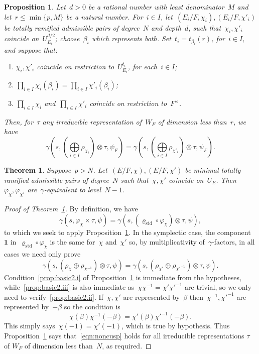 \documentclass[10pt,a4paper]{amsart}
\newtheorem{prop}{Proposition}
\newtheorem{thm}{Theorem}
\def\boI{\boldsymbol 1}
\def\rhostd{\varrho_{\mathrm{std}}} %
\begin{document}
\begin{prop}\label{prop:basic2}
Let~$d>0$ be a rational number with least denominator~$M$ and let~$r\le \min\{p,M\}$ be a natural number. 
For~$i\in I$, let~$(E_i/F,\chi_i),(E_i/F,\chi'_i)$ be totally ramified admissible pairs of degree~$N$ and depth~$d$, such that~$\chi_i,\chi'_i$ coincide on~$U^{d/2}_{E_i}$; choose~$\beta_i$ which represents both. Set~$t_i=t_{\beta_i}(r)$, for~$i\in I$, and suppose that:
\begin{enumerate}
\item\label{prop:basic2.i} $\chi_i,\chi'_i$ coincide on restriction to~$U_{E_i}^{t_i}$, for each~$i\in I$;\\[-8pt]
\item\label{prop:basic2.ii} $\prod_{i\in I} \chi_i(\beta_i) = \prod_{i\in I} \chi'_i(\beta_i)$;\\[-8pt]
\item\label{prop:basic2.iii} $ \prod_{i\in I} \chi_i$ and~$\prod_{i\in I} \chi'_i$ coincide on restriction to~$F^\times$.
\end{enumerate}
Then, for~$\tau$ any irreducible representation of~$W_F$ of dimension less than~$r$, we have
\[\textstyle
\gamma(s,(\bigoplus\limits_{i\in I} \rho_{\chi_i})\otimes\tau,\psi_F) = \gamma(s,(\bigoplus\limits_{i\in I} \rho_{\chi'_i})\otimes\tau,\psi_F).
\]
\end{prop}

\begin{thm}\label{thm:noncusp}
Suppose~$p>N$. Let~$(E/F,\chi),(E/F,\chi')$ be minimal totally ramified admissible pairs of degree~$N$ such that~$\chi,\chi'$ coincide on~$U_E$. Then~$\varphi_\chi,\varphi_{\chi'}$ are~$\gamma$-equivalent to level~$N-1$.
\end{thm}

\begin{proof}[Proof of Theorem~\ref{thm:noncusp}]
By definition, we have
\[
\gamma(s, \varphi_\chi \times \tau, \psi) = \gamma(s, (\rhostd\circ \varphi_{\chi}) \otimes \tau, \psi),
\]
to which we seek to apply Proposition~\ref{prop:basic2}. In the symplectic case, the component~$\boI$ in~$\rhostd\circ \varphi_{\chi}$ is the same for~$\chi$ and~$\chi'$ so, by multiplicativity of~$\gamma$-factors, in all cases we need only prove
\begin{equation}\label{eqn:noncusp}
\gamma(s, (\rho_\chi\oplus\rho_{\chi^{-1}}) \otimes \tau, \psi) = \gamma(s, (\rho_{\chi'}\oplus\rho_{\chi'^{-1}}) \otimes \tau, \psi).
\end{equation}
Condition~\ref{prop:basic2.i} of Proposition~\ref{prop:basic2} is immediate from the hypotheses, while~\ref{prop:basic2.iii} is also immediate as~$\chi\chi^{-1}=\chi'\chi'^{-1}$ are trivial, so we only need to verify~\ref{prop:basic2.ii}. If~$\chi,\chi'$ are represented by~$\beta$ then~$\chi^{-1},\chi'^{-1}$ are represented by~$-\beta$ so the condition is
\[
\chi(\beta)\chi^{-1}(-\beta)=\chi'(\beta)\chi'^{-1}(-\beta).
\]
This simply says~$\chi(-1)=\chi'(-1)$, which is true by hypothesis. Thus Proposition~\ref{prop:basic2} says that~\eqref{eqn:noncusp} holds for all irreducible representations $\tau$ of $W_F$ of dimension less than~$N$, as required.
\end{proof}
\end{document}
